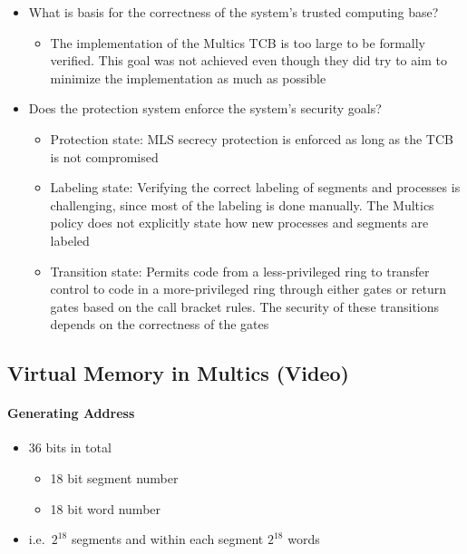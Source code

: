 \documentclass[
  12pt]{findlay}
\providecommand{\tightlist}{%
  \setlength{\itemsep}{0pt}\setlength{\parskip}{0pt}}
\begin{document}
\begin{itemize}
\tightlist
\item
  What is basis for the correctness of the system's trusted computing
  base?

  \begin{itemize}
  \tightlist
  \item
    The implementation of the Multics TCB is too large to be formally
    verified. This goal was not achieved even though they did try to aim
    to minimize the implementation as much as possible
  \end{itemize}
\item
  Does the protection system enforce the system's security goals?

  \begin{itemize}
  \tightlist
  \item
    Protection state: MLS secrecy protection is enforced as long as the
    TCB is not compromised
  \item
    Labeling state: Verifying the correct labeling of segments and
    processes is challenging, since most of the labeling is done
    manually. The Multics policy does not explicitly state how new
    processes and segments are labeled
  \item
    Transition state: Permits code from a less-privileged ring to
    transfer control to code in a more-privileged ring through either
    gates or return gates based on the call bracket rules. The security
    of these transitions depends on the correctness of the gates
  \end{itemize}
\end{itemize}

\hypertarget{virtual-memory-in-multics-video}{%
\subsection{Virtual Memory in Multics
(Video)}\label{virtual-memory-in-multics-video}}

\hypertarget{generating-address}{%
\paragraph{Generating Address}\label{generating-address}}

\begin{itemize}
\tightlist
\item
  36 bits in total

  \begin{itemize}
  \tightlist
  \item
    18 bit segment number
  \item
    18 bit word number
  \end{itemize}
\item
  i.e.~\(2^{18}\) segments and within each segment \(2^{18}\) words
\end{itemize}
\end{document}
